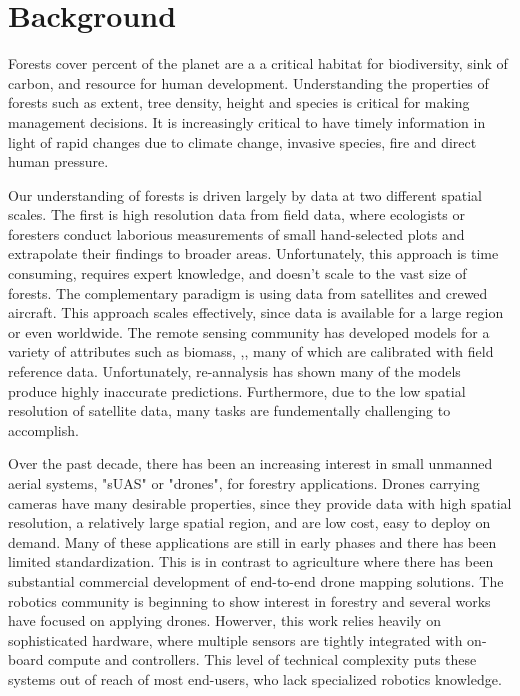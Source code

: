 
\chapter{Background} \label{secIntro}
Forests cover \todo{\%} percent of the planet are a a critical habitat for biodiversity, sink of carbon, and resource for human development. Understanding the properties of forests such as extent, tree density, height and species is critical for making management decisions. It is increasingly critical to have timely information in light of rapid changes due to climate change, invasive species, fire and direct human pressure.   

Our understanding of forests is driven largely by data at two different spatial scales. The first is high resolution data from  field data, where ecologists or foresters conduct laborious measurements of small hand-selected plots and extrapolate their findings to broader areas. Unfortunately, this approach is time consuming, requires expert knowledge, and doesn't scale to the vast size of forests. The complementary paradigm is using data from satellites and crewed aircraft. This approach scales effectively, since data is available for a large region or even worldwide. The remote sensing community has developed models for a variety of attributes such as biomass, \todo,, many of which are calibrated with field reference data. Unfortunately, re-annalysis has shown many of the models produce highly inaccurate predictions. Furthermore, due to the low spatial resolution of satellite data, many tasks are fundementally challenging to accomplish.

Over the past decade, there has been an increasing interest in small unmanned aerial systems, "sUAS" or "drones", for forestry applications. Drones carrying cameras have many desirable properties,
 since they provide data with high spatial resolution, a relatively large spatial region, and are low cost, easy to deploy on demand. 
 Many of these applications are still in early phases and there has been limited standardization. This is in contrast to agriculture where there has been substantial commercial development of end-to-end drone mapping solutions. The robotics community is beginning to show interest in forestry and several works have focused on applying drones. Howerver, this work relies heavily on sophisticated hardware, where multiple sensors are tightly integrated with on-board compute and controllers. This level of technical complexity puts these systems out of reach of most end-users, who lack specialized robotics knowledge.

